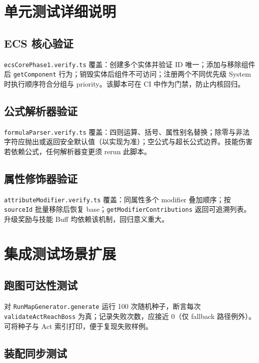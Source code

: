 ﻿
\section{单元测试详细说明}

\subsection{ECS 核心验证}

\texttt{ecsCorePhase1.verify.ts} 覆盖：创建多个实体并验证 ID 唯一；添加与移除组件后 \texttt{getComponent} 行为；销毁实体后组件不可访问；注册两个不同优先级 System 时执行顺序符合分组与 priority。该脚本可在 CI 中作为门禁，防止内核回归\cite{petty2010vv}。

\subsection{公式解析器验证}

\texttt{formulaParser.verify.ts} 覆盖：四则运算、括号、属性别名替换；除零与非法字符应抛出或返回安全默认值（以实现为准）；空公式与超长公式边界。技能伤害若依赖公式，任何解析器变更须 rerun 此脚本。

\subsection{属性修饰器验证}

\texttt{attributeModifier.verify.ts} 覆盖：同属性多个 modifier 叠加顺序；按 \texttt{sourceId} 批量移除后恢复 base；\texttt{getModifierContributions} 返回可追溯列表。升级奖励与技能 Buff 均依赖该机制，回归意义重大\cite{briand2001maintainability}。

\section{集成测试场景扩展}

\subsection{跑图可达性测试}

对 \texttt{RunMapGenerator.generate} 运行 100 次随机种子，断言每次 \texttt{validateActReachBoss} 为真；记录失败次数，应接近 0（仅 fallback 路径例外）。可将种子与 Act 索引打印，便于复现失败样例\cite{gregory2018game}。

\subsection{装配同步测试}

